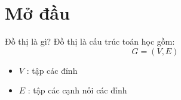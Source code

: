 \section{Mở đầu}
\begin{frame}{Đồ thị là gì?}
Đồ thị là cấu trúc toán học gồm:
\[ G = (V,E) \]
\begin{itemize}
\item $V$ : tập các đỉnh
\item $E$ : tập các cạnh nối các đỉnh
\end{itemize}
\end{frame}